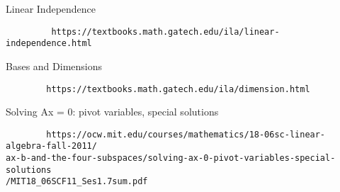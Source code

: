 \documentclass[a4paper, 11pt]{article}
\begin{document}
\newpage 

\begin{thebibliography}{}
		Linear Independence 
		\begin{verbatim}
		 https://textbooks.math.gatech.edu/ila/linear-independence.html
		\end{verbatim}
		Bases and Dimensions
		\begin{verbatim}
		https://textbooks.math.gatech.edu/ila/dimension.html	
		\end{verbatim}
		Solving Ax = 0: pivot variables, special solutions
		\begin{verbatim}
		https://ocw.mit.edu/courses/mathematics/18-06sc-linear-algebra-fall-2011/
ax-b-and-the-four-subspaces/solving-ax-0-pivot-variables-special-solutions
/MIT18_06SCF11_Ses1.7sum.pdf
		\end{verbatim}

\end{thebibliography}
\end{document}
